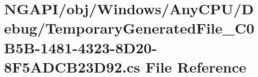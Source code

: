 \hypertarget{_n_g_a_p_i_2obj_2_windows_2_any_c_p_u_2_debug_2_temporary_generated_file__036_c0_b5_b-1481-4323-8_d20-8_f5_a_d_c_b23_d92_8cs}{}\section{N\+G\+A\+P\+I/obj/\+Windows/\+Any\+C\+P\+U/\+Debug/\+Temporary\+Generated\+File\+\_\+C0\+B5\+B-\/1481-\/4323-\/8\+D20-\/8\+F5\+A\+D\+C\+B23\+D92.cs File Reference}
\label{_n_g_a_p_i_2obj_2_windows_2_any_c_p_u_2_debug_2_temporary_generated_file__036_c0_b5_b-1481-4323-8_d20-8_f5_a_d_c_b23_d92_8cs}
